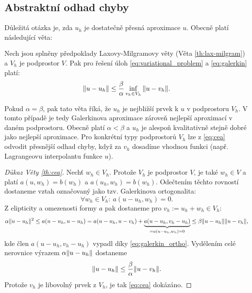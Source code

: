 \subsection{Abstraktní odhad chyby}
Důležitá otázka je, zda $u_h$ je dostatečně přesná aproximace $u$.
Obecně platí následující věta:
\begin{veta}\label{th:cea}
Nech jsou splněny předpoklady Laxovy-Milgramovy věty (Věta \ref{th:lax-milgram}) a $V_h$ je podprostor $V$.
Pak pro řešení úloh \eqref{eq:variational_problem} a \eqref{eq:galerkin} platí:
\begin{equation}\label{eq:cea}
\|u-u_h\|\le\frac\beta\alpha\inf_{v_h\in V_h} \|u-v_h\|.
\end{equation}
\end{veta}

Pokud $\alpha=\beta$, pak tato věta říká, že $u_h$ je nejbližší prvek k $u$ v podprostoru $V_h$.
V tomto případě je tedy Galerkinova aproximace zároveň nejlepší aproximací v daném podprostoru.
Obecně platí $\alpha<\beta$ a $u_h$ je alespoň kvalitativně stejně dobré jako nejlepší aproximace.
Pro konkrétní typy podprostorů $V_h$ lze z \eqref{eq:cea} odvodit přesnější odhad chyby, když za $v_h$ dosadíme vhodnou funkci (např. Lagrangeovu interpolantu funkce $u$).

\begin{proof}[Důkaz Věty \ref{th:cea}]
Nechť $w_h\in V_h$. Protože $V_h$ je podprostor $V$, je také $w_h\in V$ a platí $a(u,w_h) = b(w_h)$ a $a(u_h,w_h)=b(w_h)$.
Odečtením těchto rovností dostaneme vztah označovaný jako tzv. Galerkinova ortogonalita:
\begin{equation}\label{eq:galerkin_ortho}
\forall w_h\in V_h:~a(u-u_h,w_h)=0.
\end{equation}
Z elipticity a omezenosti formy $a$ pak dostaneme pro $v_h:=u_h+w_h\in V_h$:
\[ \alpha\|u-u_h\|^2 \le a(u-u_h,u-u_h) = a(u-u_h,u-v_h) + \underbrace{a(u-u_h,v_h-u_h)}_{=a(u-u_h,w_h)=0} \le \beta\|u-u_h\|\|u-v_h\|, \]
kde člen $a(u-u_h,v_h-u_h)$ vypadl díky \eqref{eq:galerkin_ortho}.
Vydělením celé nerovnice výrazem $\alpha\|u-u_h\|$ dostaneme
\[ \|u-u_h\| \le \frac\beta\alpha\|u-v_h\|. \]
Protože $v_h$ je libovolný prvek z $V_h$, je tak \eqref{eq:cea} dokázáno.
\end{proof}

